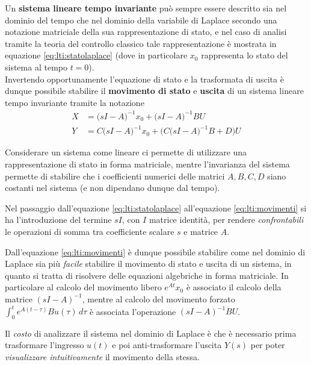 	\begin{concetto}
		Un \textbf{sistema lineare tempo invariante} può sempre essere descritto sia nel dominio del tempo che nel dominio della variabile di Laplace secondo una notazione matriciale della sua rappresentazione di stato, e nel caso di analisi tramite la teoria del controllo classico tale rappresentazione è mostrata in equazione \ref{eq:lti:statolaplace} (dove in particolare $x_0$ rappresenta lo stato del sistema al tempo $t=0$). \\ Invertendo opportunamente l'equazione di stato e la trasformata di uscita è dunque possibile stabilire il \textbf{movimento di stato} e \textbf{uscita} di un sistema lineare tempo invariante tramite la notazione
		\begin{equation} \label{eq:lti:movimenti}
		\begin{aligned}
			X & = \big(sI-A\big)^{-1} x_0 + \big(sI-A\big)^{-1} BU \\
			Y & = C \big(sI-A\big)^{-1} x_0 + \Big(C\big(sI-A\big)^{-1}B + D\Big)U
		\end{aligned}
		\end{equation}	
	\end{concetto}
	\begin{nota}
		Considerare un sistema come lineare ci permette di utilizzare una rappresentazione di stato in forma matriciale, mentre l'invarianza del sistema permette di stabilire che i coefficienti numerici delle matrici $A,B,C,D$ siano costanti nel sistema (e non dipendano dunque dal tempo).
	\end{nota}
	\begin{nota}
		Nel passaggio dall'equazione \ref{eq:lti:statolaplace} all'equazione \ref{eq:lti:movimenti} si ha l'introduzione del termine $sI$, con $I$ matrice identità, per rendere \textit{confrontabili} le operazioni di somma tra coefficiente scalare $s$ e matrice $A$.
	\end{nota}

	Dall'equazione \ref{eq:lti:movimenti} è dunque possibile stabilire come nel dominio di Laplace sia più \textit{facile} stabilire il movimento di stato e uscita di un sistema, in quanto si tratta di risolvere delle equazioni algebriche in forma matriciale. In particolare al calcolo del movimento libero $ e^{At} x_0 $ è associato il calcolo della matrice $(sI-A)^{-1}$, mentre al calcolo del movimento forzato $\int_0^t e^{A(t-\tau)} B u(\tau)\, d\tau$ è associata l'operazione $(sI-A)^{-1}BU$.
	
	Il \textit{costo} di analizzare il sistema nel dominio di Laplace è che è necessario prima trasformare l'ingresso $u(t)$ e poi anti-trasformare l'uscita $Y(s)$ per poter \textit{visualizzare intuitivamente} il movimento della stessa.
	
